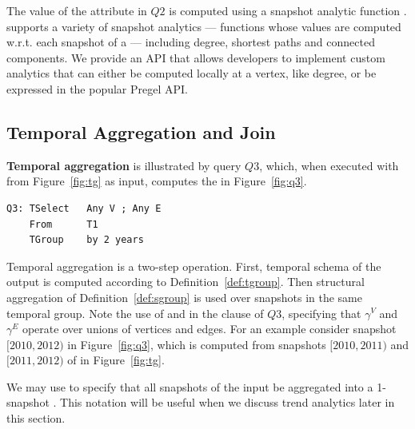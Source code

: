 The value of the attribute  in $Q2$ is computed using a
snapshot analytic function .  \ql supports a variety
of snapshot analytics --- functions whose values are computed
w.r.t. each snapshot of a \tg --- including degree, shortest paths and
connected components.  We provide an API that allows developers to
implement custom analytics that can either be computed locally at a
vertex, like degree, or be expressed in the popular Pregel API.

\subsection{Temporal Aggregation and Join}
\label{sec:example:groupjoin}

{\bf Temporal aggregation} is illustrated by query $Q3$, which, when
executed with  from Figure~\ref{fig:tg} as input, computes
the \tg in Figure~\ref{fig:q3}.

\begin{small}
\begin{verbatim}
Q3: TSelect   Any V ; Any E 
    From      T1
    TGroup    by 2 years
\end{verbatim}
\end{small}

Temporal aggregation is a two-step operation.  First, temporal schema
of the output is computed according to Definition~\ref{def:tgroup}.
Then structural aggregation of Definition~\ref{def:sgroup} is used
over snapshots in the same temporal group.  Note the use of  and  in the  clause of $Q3$,
specifying that $\gamma^{V}$ and $\gamma^{E}$ operate over unions of
vertices and edges.  For an example consider snapshot $[2010, 2012)$
  in Figure~\ref{fig:q3}, which is computed from snapshots $[2010,
    2011)$ and $[2011, 2012)$ of  in Figure~\ref{fig:tg}.


We may use  to specify that all snapshots of the
input \tg be aggregated into a 1-snapshot \tg.  This notation will be
useful when we discuss trend analytics later in this section.

